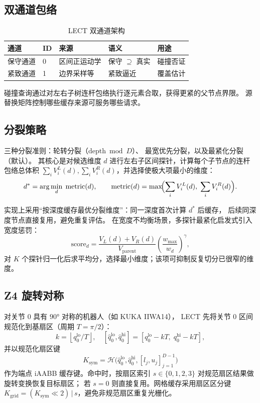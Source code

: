 \documentclass[journal]{IEEEtran}
\begin{document}
\subsection{双通道包络}

\begin{table}[ht]
\centering
\caption{LECT 双通道架构}
\label{tab:channels}
\begin{tabular}{@{}lllll@{}}
\toprule
\textbf{通道} & \textbf{ID} & \textbf{来源} & \textbf{语义} & \textbf{用途} \\
\midrule
保守通道 & 0 & 区间正运动学 & 保守 $\supseteq$ 真实 & 碰撞否证 \\
紧致通道 & 1 & 边界采样等 & 紧致逼近 & 覆盖估计 \\
\bottomrule
\end{tabular}
\end{table}

碰撞查询通过对左右子树连杆包络执行逐元素合取，获得更紧的父节点界限。
源替换矩阵控制哪些缓存来源可服务哪些请求。

\subsection{分裂策略}

三种分裂准则：轮转分裂（$\mathrm{depth}\bmod D$）、
最宽优先分裂，以及最紧化分裂（默认）。
其核心是对候选维度 $d$ 进行左右子区间探针，计算每个子节点的连杆包络总体积
$\sum_i V_i^L(d),\sum_i V_i^R(d)$，并选择使极大项最小的维度：
\begin{equation}
  d^* = \arg\min_d\; \text{metric}(d),\qquad
  \text{metric}(d)=\max\!\Bigl(\sum_i V_i^L(d),\;\sum_i V_i^R(d)\Bigr).
\end{equation}

实现上采用“按深度缓存最优分裂维度”：同一深度首次计算 $d^*$ 后缓存，
后续同深度节点直接复用，避免重复评估。
在宽度不均衡场景，多探针最紧化启发式引入宽度惩罚：
\begin{equation}
  \text{score}_d
  = \frac{V_L(d)+V_R(d)}{V_{\text{parent}}}
    \left(\frac{w_{\max}}{w_d}\right)^{\gamma},
\end{equation}
对 $K$ 个探针归一化后求平均分，选择最小维度；该项可抑制反复切分已很窄的维度。

\subsection{Z4 旋转对称}

对关节 0 具有 $90°$ 对称的机器人（如 KUKA IIWA14），
LECT 先将关节 0 区间规范化到基扇区（周期 $T=\pi/2$）：
\begin{equation}
  k=\left\lfloor q_0^{\mathrm{lo}}/T \right\rfloor,\quad
  [\hat q_0^{\mathrm{lo}},\hat q_0^{\mathrm{hi}}]=
  [q_0^{\mathrm{lo}}-kT,\;q_0^{\mathrm{hi}}-kT],
\end{equation}
并以规范化扇区键
\begin{equation}
  K_{\mathrm{sym}}=\mathcal{H}\bigl(\hat q_0^{\mathrm{lo}},\hat q_0^{\mathrm{hi}},
  [l_j,u_j]_{j=1}^{D-1}\bigr)
\end{equation}
作为端点 iAABB 缓存键。命中时，按扇区索引 $s\in\{0,1,2,3\}$ 对规范扇区结果做旋转变换恢复目标扇区；
若 $s=0$ 则直接复用。网格缓存采用扇区区分键
$K_{\mathrm{grid}}=(K_{\mathrm{sym}}\ll 2)\,|\,s$，避免非规范扇区重复光栅化。
\end{document}

